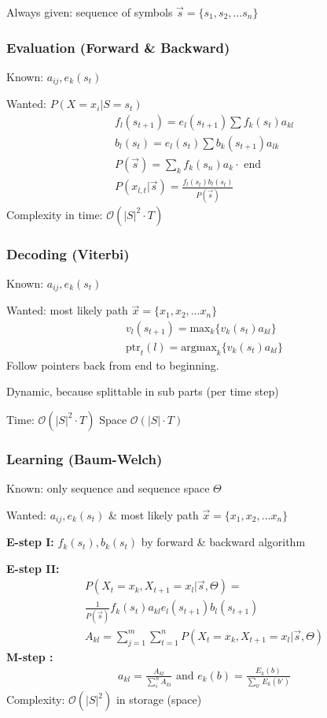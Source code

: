 \documentclass[main]{subfiles}
\begin{document}
\begin{landscape}
\begin{multicols}{4}
Always given: sequence of symbols $\vec{s} = \{s_1,s_2, \ldots s_n\}$
{\color{subsubsectionColor}\subsubsection{Evaluation (Forward \& Backward)}}
Known: $a_{ij}, e_k(s_t)$

Wanted: $P(X = x_i | S = s_t)$
\begin{eqnarray}
f_l (s_{t+1}) = e_l(s_{t+1}) \sum f_k(s_t) a_{kl} \\
b_l(s_t) = e_l(s_t) \sum b_k(s_{t+1}) a_{lk} \\
P(\vec{s}) = \sum_k f_k(s_n) a_k \cdot \text{ end} \\
P(x_{l,t} | \vec{s}) = \frac{f_l(s_t) b_l(s_t)}{P(\vec{s})}
\end{eqnarray}
Complexity in time: $\mathcal{O}(|S|^2 \cdot T)$

{\color{subsubsectionColor}\subsubsection{Decoding (Viterbi)}}
Known: $a_{ij}, e_k(s_t)$

Wanted: most likely path $\vec{x} = \{x_1,x_2,\ldots x_n\}$
\begin{eqnarray}
v_l(s_{t+1}) = \text{max}_k \{ v_k(s_t) a_{kl} \} \\
\text{ptr}_t(l) = \text{argmax}_k \{ v_k(s_t) a_{kl} \}
\end{eqnarray}
Follow pointers back from end to beginning.

Dynamic, because splittable in sub parts (per time step)

Time: $\mathcal{O}(|S|^2 \cdot T)$
Space $\mathcal{O}(|S| \cdot T)$

{\color{subsubsectionColor}\subsubsection{Learning (Baum-Welch)}}
Known: only sequence and sequence space $\Theta$

Wanted: $a_{ij}, e_k(s_t)$ \& most likely path $\vec{x} = \{x_1,x_2,\ldots x_n\}$

\textbf{E-step I:} $f_k(s_t), b_k(s_t)$ by forward \& backward algorithm

\textbf{E-step II:}
\begin{eqnarray}
P(X_t = x_k, X_{t+1} = x_l | \vec{s}, \Theta) = \\
 \frac{1}{P(\vec{s})} f_k(s_t) a_{kl} e_l(s_{t+1}) b_l(s_{t+1}) \\
A_{kl} = \sum\limits_{j=1}^m \sum\limits_{t=1}^n P(X_t = x_k, X_{t+1} = x_l | \vec{s}, \Theta)
\end{eqnarray}
\textbf{M-step :}
\begin{eqnarray}
a_{kl} = \frac{A_{kl}}{\sum\limits_i^n A_{ki}} \text{   and   } e_k(b) = \frac{E_k(b)}{\sum_{b'} E_k(b')}
\end{eqnarray}
Complexity: $\mathcal{O}(|S|^2)$ in storage (space)
\end{multicols}
\end{landscape}
\end{document}
